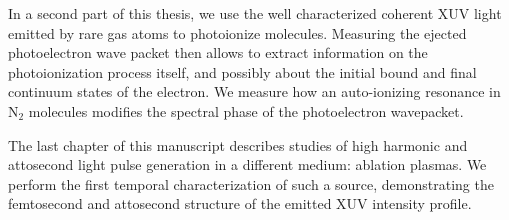 In a second part of this thesis, we use the well characterized coherent XUV light emitted by rare gas atoms to photoionize molecules. Measuring the ejected photoelectron wave packet then allows to extract information on the photoionization process itself, and possibly about the initial bound and final continuum states of the electron. We measure how an auto-ionizing resonance in N$_2$ molecules modifies the spectral phase of the photoelectron wavepacket.

The last chapter of this manuscript describes studies of high harmonic and attosecond light pulse generation in a different medium: ablation plasmas. We perform the first temporal characterization of such a source, demonstrating the femtosecond and attosecond structure of the emitted XUV intensity profile. 